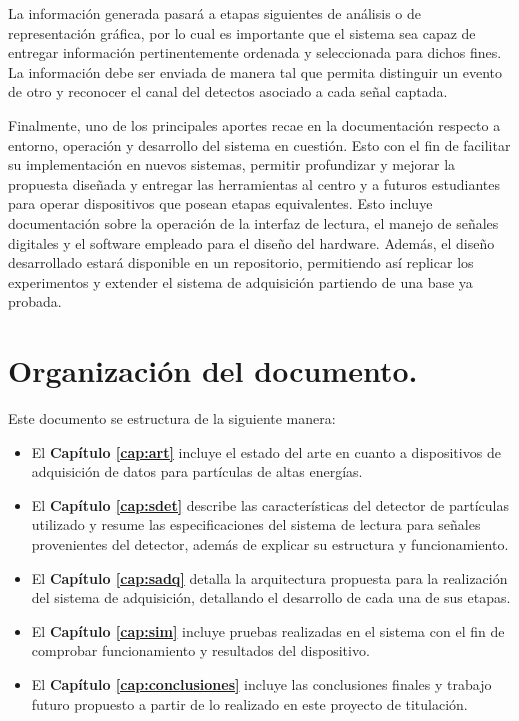 	La información generada pasará a etapas siguientes de análisis o de representación gráfica, por lo cual es importante que el sistema sea capaz de entregar información pertinentemente ordenada y seleccionada para dichos fines. La información debe ser enviada de manera tal que permita distinguir un evento de otro y reconocer el canal del detectos asociado a cada señal captada.
	
	Finalmente, uno de los principales aportes recae en la documentación respecto a entorno, operación y desarrollo del sistema en cuestión. Esto con el fin de facilitar su implementación en nuevos sistemas, permitir profundizar y mejorar la propuesta diseñada y entregar las herramientas al centro y a futuros estudiantes para operar dispositivos que posean etapas equivalentes. Esto incluye documentación sobre la operación de la interfaz de lectura, el manejo de señales digitales y el software empleado para el diseño del hardware. Además, el diseño desarrollado estará disponible en un repositorio, permitiendo así replicar los experimentos y extender el sistema de adquisición partiendo de una base ya probada.


\section{Organización del documento.}

	Este documento se estructura de la siguiente manera:
	
	\begin{itemize}
		\item El \textbf{Capítulo \ref{cap:art}} incluye el estado del arte en cuanto a dispositivos de adquisición de datos para partículas de altas energías.
		\item El \textbf{Capítulo \ref{cap:sdet}} describe las características del detector de partículas utilizado y resume las especificaciones del sistema de lectura para señales provenientes del detector, además de explicar su estructura y funcionamiento.
		\item El \textbf{Capítulo \ref{cap:sadq}} detalla la arquitectura propuesta para la realización del sistema de adquisición, detallando el desarrollo de cada una de sus etapas.
		\item El \textbf{Capítulo \ref{cap:sim}} incluye pruebas realizadas en el sistema con el fin de comprobar funcionamiento y resultados del dispositivo.
		\item El \textbf{Capítulo \ref{cap:conclusiones}} incluye las conclusiones finales y trabajo futuro propuesto a partir de lo realizado en este proyecto de titulación.
	\end{itemize}

